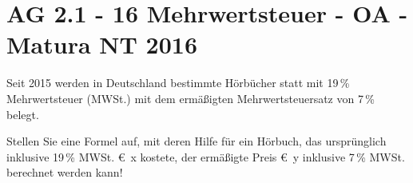\section{AG 2.1 - 16 Mehrwertsteuer - OA - Matura NT 2016}

\begin{beispiel}[AG 2.1]{1} %
Seit 2015 werden in Deutschland bestimmte Hörbücher statt mit 19\,\% Mehrwertsteuer (MWSt.) mit dem ermäßigten Mehrwertsteuersatz von 7\,\% belegt.

Stellen Sie eine Formel auf, mit deren Hilfe für ein Hörbuch, das ursprünglich inklusive 19\,\% MWSt. \euro\, x kostete, der ermäßigte Preis \euro\, y inklusive 7\,\% MWSt. berechnet werden kann!

\end{beispiel}